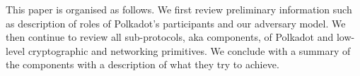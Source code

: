 This paper is organised as follows. We first review preliminary information such as description of roles of Polkadot's participants and our adversary model. We then continue to review all sub-protocols, aka components, of Polkadot and low-level cryptographic and networking primitives. We conclude with a summary of the components with a description of what they try to achieve. 





